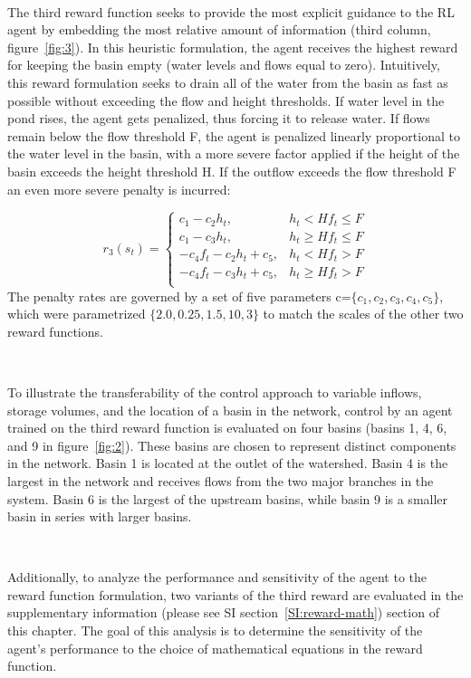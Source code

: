 \

The third reward function seeks to provide the most explicit guidance to the RL agent by embedding the most relative amount of information (third column, figure~\ref{fig:3}).
In this heuristic formulation, the agent receives the highest reward for keeping the basin empty (water levels and flows equal to zero).
Intuitively, this reward formulation seeks to drain all of the water from the basin as fast as possible without exceeding the flow and height thresholds.
If water level in the pond rises, the agent gets penalized, thus forcing it to release water.
If flows remain below the flow threshold F, the agent is penalized linearly proportional to the water level in the basin, with a more severe factor applied if the height of the basin exceeds the height threshold H. If the outflow exceeds the flow threshold F an even more severe penalty is incurred:

\begin{equation}
r_3 (s_t )= 	\begin{cases}
		c_1-c_2 h_t, & h_t < H  f_t \leq F\\
		c_1-c_3 h_t, & h_t \geq H  f_t \leq F\\
		-c_4 f_t - c_2 h_t + c_5, & h_t < H  f_t > F\\
		-c_4 f_t - c_3 h_t + c_5, & h_t \geq H  f_t > F\\
		\end{cases}
		\label{third}
\end{equation}
The penalty rates are governed by a set of five parameters c=$\{c_1,c_2,c_3,c_4,c_5\}$, which were parametrized $\{2.0, 0.25, 1.5, 10, 3\}$ to match the scales of the other two reward functions.

\

To illustrate the transferability of the control approach to variable inflows, storage volumes, and the location of a basin in the network, control by an agent trained on the third reward function is evaluated on four basins (basins 1, 4, 6, and 9 in figure~\ref{fig:2}).
These basins are chosen to represent distinct components in the network.
Basin 1 is located at the outlet of the watershed.
Basin 4 is the largest in the network and receives flows from the two major branches in the system.
Basin 6 is the largest of the upstream basins, while basin 9 is a smaller basin in series with larger basins.

\

Additionally, to analyze the performance and sensitivity of the agent to the reward function formulation, two variants of the third reward are evaluated in the supplementary information (please see SI section~\ref{SI:reward-math}) section of this chapter.
The goal of this analysis is to determine the sensitivity of the agent's performance to the choice of mathematical equations in the reward function.

